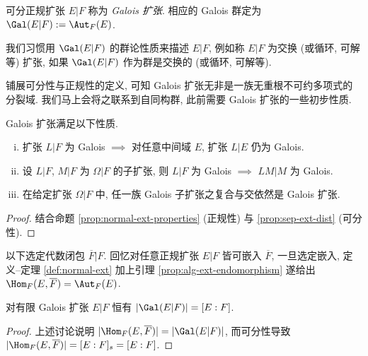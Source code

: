 \begin{definition}\label{def:Galois-ext} 
	可分正规扩张 $E|F$ 称为 \emph{Galois 扩张}. 相应的 Galois 群定为 $\Gal(E|F) := \Aut_F(E)$.
	
	我们习惯用 $\Gal(E|F)$ 的群论性质来描述 $E|F$, 例如称 $E|F$ 为交换 (或循环, 可解等) 扩张, 如果 $\Gal(E|F)$ 作为群是交换的 (或循环, 可解等).
\end{definition}
铺展可分性与正规性的定义, 可知 Galois 扩张无非是一族无重根不可约多项式的分裂域. 我们马上会将之联系到自同构群, 此前需要 Galois 扩张的一些初步性质.

\begin{lemma}\label{prop:Galois-properties}
	Galois 扩张满足以下性质.
	\begin{enumerate}[(i)]
		\item 扩张 $L|F$ 为 Galois $\implies$ 对任意中间域 $E$, 扩张 $L|E$ 仍为 Galois.
		\item 设 $L|F$, $M|F$ 为 $\Omega|F$ 的子扩张, 则 $L|F$ 为 Galois $\implies$ $LM|M$ 为 Galois.
		\item 在给定扩张 $\Omega|F$ 中, 任一族 Galois 子扩张之复合与交依然是 Galois 扩张.
	\end{enumerate}
\end{lemma}
\begin{proof}
	结合命题 \ref{prop:normal-ext-properties} (正规性) 与 \ref{prop:sep-ext-dist} (可分性).
\end{proof}

以下选定代数闭包 $\overline{F}|F$. 回忆对任意正规扩张 $E|F$ 皆可嵌入 $\overline{F}$, 一旦选定嵌入, 定义--定理 \ref{def:normal-ext} 加上引理 \ref{prop:alg-ext-endomorphism} 遂给出 $\Hom_F(E, \overline{F}) = \Aut_F(E)$.
\begin{proposition}\label{prop:Galois-order-degree}
	对有限 Galois 扩张 $E|F$ 恒有 $|\Gal(E|F)| = [E:F]$.
\end{proposition}
\begin{proof}
	上述讨论说明 $|\Hom_F(E, \overline{F})| = |\Gal(E|F)|$, 而可分性导致 $|\Hom_F(E, \overline{F})| = [E:F]_s = [E:F]$.
\end{proof}

